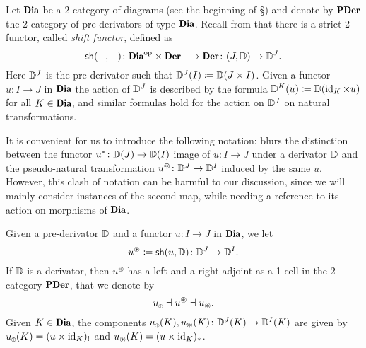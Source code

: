 Let $\Dia$ be a $2$-category of diagrams (see the beginning of §) and denote by $\PDer$ the 2-category of pre-derivators of type $\Dia$. Recall from \cite[\textbf{2.1}.(ii)]{Moritz} that there is a strict 2-functor, called \emph{shift functor}, defined as
\[
\textsf{sh}(-,-)\colon \Dia^\opp\times \Der\longrightarrow \Der\colon(J,\D)\mapsto \D^{J}.
\]
Here $\mathbb{D}^J$ is the pre-derivator such that $\mathbb{D}^J(I) \coloneqq \mathbb{D}(J\times I)$. Given a functor $u\colon I\to J$ in $\Dia$ the action of $\mathbb{D}^J$ is described by the formula $\mathbb{D}^K(u) \coloneqq \mathbb{D}(\operatorname{id}_K\times u)$ for all $K\in\Dia$, and similar formulas hold for the action on $\mathbb{D}^J$ on natural transformations. 

It is convenient for us to introduce the following notation: \cite{Moritz} blurs the distinction between the functor $u^*\colon \mathbb{D}(J)\to \mathbb{D}(I)$ image of $u\colon I\to J$ under a derivator $\mathbb{D}$ and the pseudo\hyp{}natural transformation $u^\protect{\tiny \oast}\colon \mathbb{D}^{J}\to \mathbb{D}^{I}$ induced by the same $u$. However, this clash of notation can be harmful to our discussion, since we will mainly consider instances of the second map, while needing a reference to its action on morphisms of $\Dia$.
\begin{notat}
Given a pre-derivator $\mathbb{D}$ and a functor $u\colon I\to J$ in $\Dia$, we let 
\[
u^\protect{\tiny \oast}  \coloneqq \textsf{sh}(u,\mathbb{D})\colon \mathbb{D}^{J}\to \mathbb{D}^{I}.
\]
If $\mathbb{D}$ is a derivator, then $u^\circledast$ has a left and a right adjoint as a 1-cell in the 2-category $\PDer$, that we denote by
\[
u_\circledbang\dashv u^\circledast\dashv u_\circledast.
\]
Given $K\in \Dia$, the components $u_\circledbang(K),u_\circledast(K)\colon \D^{J}(K)\to \D^{I}(K)$ are given by
$u_\circledbang(K)=(u\times \id_K)_!$ and $u_\protect{\tiny \oast}(K)=(u\times \operatorname{id}_K)_*$.
\end{notat}
